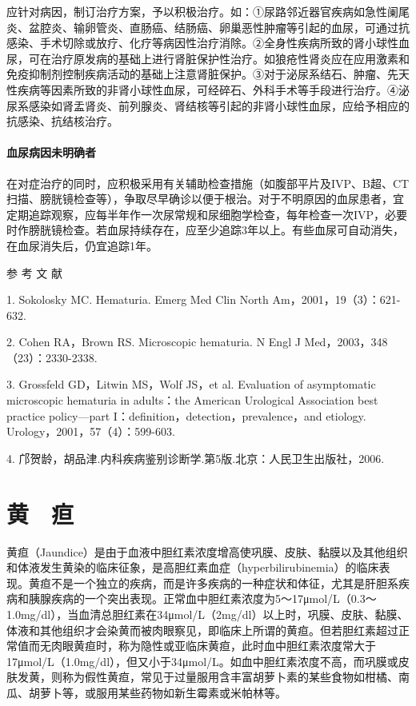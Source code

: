 应针对病因，制订治疗方案，予以积极治疗。如：①尿路邻近器官疾病如急性阑尾炎、盆腔炎、输卵管炎、直肠癌、结肠癌、卵巢恶性肿瘤等引起的血尿，可通过抗感染、手术切除或放疗、化疗等病因性治疗消除。②全身性疾病所致的肾小球性血尿，可在治疗原发病的基础上进行肾脏保护性治疗。如狼疮性肾炎应在应用激素和免疫抑制剂控制疾病活动的基础上注意肾脏保护。③对于泌尿系结石、肿瘤、先天性疾病等因素所致的非肾小球性血尿，可经碎石、外科手术等手段进行治疗。④泌尿系感染如肾盂肾炎、前列腺炎、肾结核等引起的非肾小球性血尿，应给予相应的抗感染、抗结核治疗。

\subsubsection{血尿病因未明确者}

在对症治疗的同时，应积极采用有关辅助检查措施（如腹部平片及IVP、B超、CT扫描、膀胱镜检查等），争取尽早确诊以便于根治。对于不明原因的血尿患者，宜定期追踪观察，应每半年作一次尿常规和尿细胞学检查，每年检查一次IVP，必要时作膀胱镜检查。若血尿持续存在，应至少追踪3年以上。有些血尿可自动消失，在血尿消失后，仍宜追踪1年。

\protect\hypertarget{text00038.html}{}{}

\hypertarget{text00038.htmlux5cux23CHP1-15-4}{}
参 考 文 献

1. Sokolosky MC. Hematuria. Emerg Med Clin North
Am，2001，19（3）：621-632.

2. Cohen RA，Brown RS. Microscopic hematuria. N Engl J
Med，2003，348（23）：2330-2338.

3. Grossfeld GD，Litwin MS，Wolf JS，et al. Evaluation of asymptomatic
microscopic hematuria in adults：the American Urological Association
best practice policy---part I：definition，detection，prevalence，and
etiology. Urology，2001，57（4）：599-603.

4. 邝贺龄，胡品津.内科疾病鉴别诊断学.第5版.北京：人民卫生出版社，2006.

\protect\hypertarget{text00039.html}{}{}

\chapter{黄　疸}

黄疸（Jaundice）是由于血液中胆红素浓度增高使巩膜、皮肤、黏膜以及其他组织和体液发生黄染的临床征象，是高胆红素血症（hyperbilirubinemia）的临床表现。黄疸不是一个独立的疾病，而是许多疾病的一种症状和体征，尤其是肝胆系疾病和胰腺疾病的一个突出表现。正常血中胆红素浓度为5～17μmol/L（0.3～1.0mg/dl），当血清总胆红素在34μmol/L（2mg/dl）以上时，巩膜、皮肤、黏膜、体液和其他组织才会染黄而被肉眼察见，即临床上所谓的黄疸。但若胆红素超过正常值而无肉眼黄疸时，称为隐性或亚临床黄疸，此时血中胆红素浓度常大于17μmol/L（1.0mg/dl），但又小于34μmol/L。如血中胆红素浓度不高，而巩膜或皮肤发黄，则称为假性黄疸，常见于过量服用含丰富胡萝卜素的某些食物如柑橘、南瓜、胡萝卜等，或服用某些药物如新生霉素或米帕林等。

